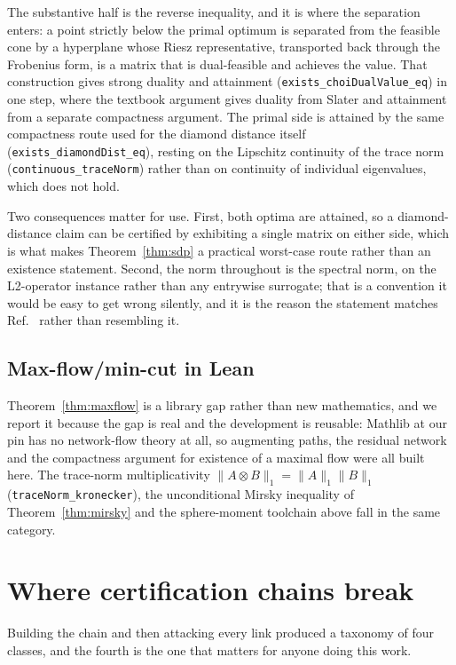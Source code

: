 \documentclass[aps,pra,reprint,nofootinbib,superscriptaddress]{revtex4-2}
\theoremstyle{plain}
\theoremstyle{definition}
\theoremstyle{remark}
\newcommand{\lean}[1]{\texttt{#1}}
\newcommand{\trnorm}[1]{\lVert #1 \rVert_{1}}
\begin{document}
The substantive half is the reverse inequality, and it is where the
separation enters: a point strictly below the primal optimum is
separated from the feasible cone by a hyperplane whose Riesz
representative, transported back through the Frobenius form, is a matrix
that is dual-feasible and achieves the value. That construction gives
strong duality and attainment (\lean{exists\_choiDualValue\_eq}) in one
step, where the textbook argument gives duality from Slater and
attainment from a separate compactness argument. The primal side is
attained by the same compactness route used for the diamond distance
itself (\lean{exists\_diamondDist\_eq}), resting on the Lipschitz
continuity of the trace norm (\lean{continuous\_traceNorm}) rather than
on continuity of individual eigenvalues, which does not hold.

Two consequences matter for use. First, both optima are attained, so a
diamond-distance claim can be certified by exhibiting a single matrix on
either side, which is what makes Theorem~\ref{thm:sdp} a practical
worst-case route rather than an existence statement. Second, the norm
throughout is the spectral norm, on the L2-operator instance rather than
any entrywise surrogate; that is a convention it would be easy to get
wrong silently, and it is the reason the statement matches
Ref.~\cite{Watrous2018} rather than resembling it.

\subsection{Max-flow/min-cut in Lean}

Theorem~\ref{thm:maxflow} is a library gap rather than new mathematics,
and we report it because the gap is real and the development is
reusable: Mathlib at our pin has no network-flow theory at all, so
augmenting paths, the residual network and the compactness argument for
existence of a maximal flow were all built here. The trace-norm
multiplicativity $\trnorm{A\otimes B} = \trnorm{A}\trnorm{B}$
(\lean{traceNorm\_kronecker}), the unconditional Mirsky inequality of
Theorem~\ref{thm:mirsky} and the sphere-moment toolchain above fall in
the same category.

\section{Where certification chains break}
\label{sec:breaks}

Building the chain and then attacking every link produced a taxonomy of
four classes, and the fourth is the one that matters for anyone doing
this work.
\end{document}
